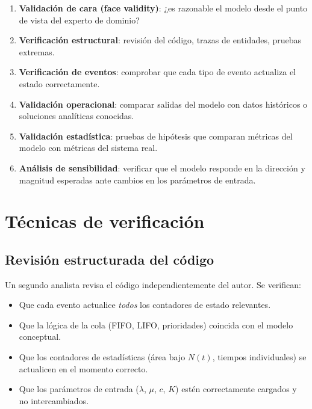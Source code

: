 \documentclass[11pt, letterpaper]{article}
\begin{document}
\begin{metodobox}
\begin{enumerate}
    \item \textbf{Validación de cara (face validity)}: ¿es razonable el modelo desde el punto de vista del experto de dominio?
    \item \textbf{Verificación estructural}: revisión del código, trazas de entidades, pruebas extremas.
    \item \textbf{Verificación de eventos}: comprobar que cada tipo de evento actualiza el estado correctamente.
    \item \textbf{Validación operacional}: comparar salidas del modelo con datos históricos o soluciones analíticas conocidas.
    \item \textbf{Validación estadística}: pruebas de hipótesis que comparan métricas del modelo con métricas del sistema real.
    \item \textbf{Análisis de sensibilidad}: verificar que el modelo responde en la dirección y magnitud esperadas ante cambios en los parámetros de entrada.
\end{enumerate}
\end{metodobox}

\section{Técnicas de verificación}

\subsection{Revisión estructurada del código}

Un segundo analista revisa el código independientemente del autor. Se verifican:
\begin{itemize}
    \item Que cada evento actualice \emph{todos} los contadores de estado relevantes.
    \item Que la lógica de la cola (FIFO, LIFO, prioridades) coincida con el modelo conceptual.
    \item Que los contadores de estadísticas (área bajo $N(t)$, tiempos individuales) se actualicen en el momento correcto.
    \item Que los parámetros de entrada ($\lambda$, $\mu$, $c$, $K$) estén correctamente cargados y no intercambiados.
\end{itemize}
\end{document}
